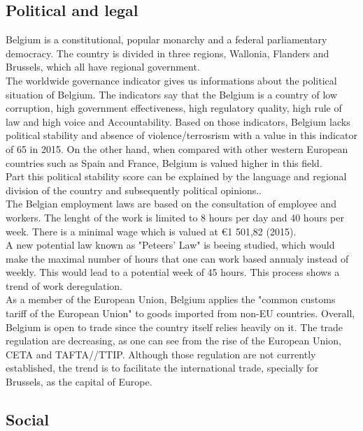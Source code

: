 \documentclass[12pt,a4paper,oneside]{book}
\begin{document}
\subsection{Political and legal}

Belgium is a constitutional, popular monarchy and a federal parliamentary democracy. The country is divided in three regions, Wallonia, Flanders and Brussels, which all have regional government.\\
The worldwide governance indicator gives us informations about the political situation of Belgium. The indicators say that the Belgium is a country of low corruption, high government effectiveness, high regulatory quality, high rule of law and high voice and Accountability. Based on those indicators, Belgium lacks political stability and absence of violence/terrosrism with a value in this indicator of 65 in 2015\cite{wbgi}. On the other hand, when compared with other western European countries such as Spain and France, Belgium is valued higher in this field.\\
Part this political stability score can be explained by the language and regional division of the country and subsequently political opinions.\cite{bailo2016political}.\\

The Belgian employment laws are based on the consultation of employee and workers. The lenght of the work is limited to 8 hours per day and 40 hours per week. There is a minimal wage which is valued at \euro 1 501,82 (2015)\cite{eurostatmw}.\\
A new potential law known as "Peteers' Law" is beeing studied, which would make the maximal number of hours that one can work based annualy instead of weekly. This would lead to a potential week of 45 hours.\cite{rtlp} This process shows a trend of work deregulation.\\

As a member of the European Union, Belgium applies the "common customs tariff of the European Union" to goods imported from non-EU countries. Overall, Belgium is open to trade since the country itself relies heavily on it. The trade regulation are decreasing, as one can see from the rise of the European Union, CETA and TAFTA//TTIP. Although those regulation are not currently established, the trend is to facilitate the international trade, specially for Brussels, as the capital of Europe.\\

\subsection{Social}
\end{document}
